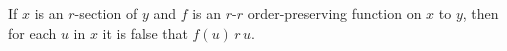 If $x$ is an $r$-section of $y$ and $f$ is an $r$-$r$ order-preserving function on $x$ to $y$, then for each $u$ in $x$ it is false that $f(u) \, r \, u$.
